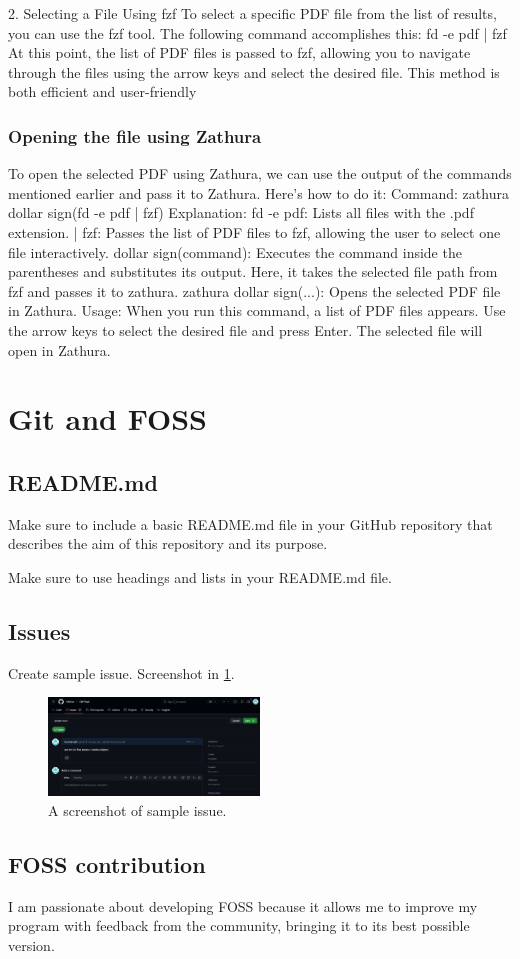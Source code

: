 \documentclass[12pt]{article}
\begin{document}
2. Selecting a File Using fzf
To select a specific PDF file from the list of results, you can use the fzf tool. The following command accomplishes this:
fd -e pdf | fzf
At this point, the list of PDF files is passed to fzf, allowing you to navigate through the files using the arrow keys and select the desired file. This method is both efficient and user-friendly

\subsubsection{Opening the file using Zathura}
To open the selected PDF using Zathura, we can use the output of the commands mentioned earlier and pass it to Zathura. Here’s how to do it:
Command:
zathura dollar sign(fd -e pdf | fzf)
Explanation:
fd -e pdf: Lists all files with the .pdf extension.
| fzf: Passes the list of PDF files to fzf, allowing the user to select one file interactively.
dollar sign(command): Executes the command inside the parentheses and substitutes its output. Here, it takes the selected file path from fzf and passes it to zathura.
zathura dollar sign(...): Opens the selected PDF file in Zathura.
Usage:
When you run this command, a list of PDF files appears. Use the arrow keys to select the desired file and press Enter. The selected file will open in Zathura.

\section{Git and FOSS}
\subsection{README.md}
Make sure to include a basic README.md file in your GitHub repository that describes the aim of this repository and its purpose.

Make sure to use headings and lists in your README.md file.

\subsection{Issues}
Create sample issue. Screenshot in \ref{fig:issue}.
\begin{figure}[htbp]
    \centering
    \includegraphics[width=0.5\textwidth]{pic/Screenshot 2025-01-19 235151.png}
    \caption{A screenshot of sample issue.}
    \label{fig:issue}
\end{figure}

\subsection{FOSS contribution}
I am passionate about developing FOSS because it allows me to improve my program with feedback from the community, bringing it to its best possible version.
\pagebreak
\end{document}
